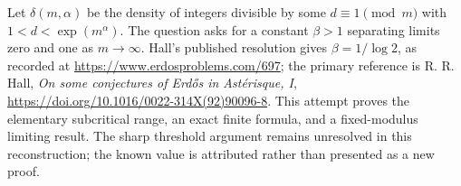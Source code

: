 Let \(\delta(m,\alpha)\) be the density of integers divisible by
some \(d\equiv1\pmod m\) with \(1<d<\exp(m^\alpha)\).
The question asks for a constant \(\beta>1\) separating limits
zero and one as \(m\longrightarrow\infty\).
Hall's published resolution gives \(\beta=1/\log2\), as recorded
at \url{https://www.erdosproblems.com/697};
the primary reference is R. R. Hall,
\emph{On some conjectures of Erd\H{o}s in Ast\'erisque, I},
\url{https://doi.org/10.1016/0022-314X(92)90096-8}.
This attempt proves the elementary subcritical range,
an exact finite formula, and a fixed-modulus limiting result.
The sharp threshold argument remains unresolved in this
reconstruction; the known value is attributed rather than
presented as a new proof.
